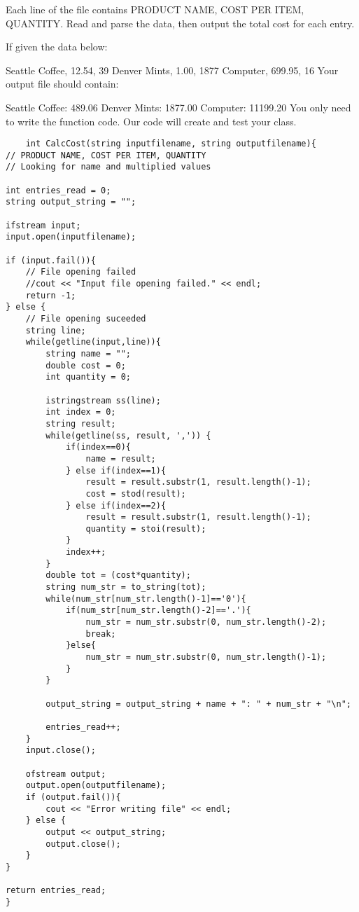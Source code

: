 \documentclass{article}
\begin{document}
\begin{enumerate}
Each line of the file contains PRODUCT NAME, COST PER ITEM, QUANTITY.  Read and parse the data, then output the total cost for each entry.

If given the data below:

Seattle Coffee, 12.54, 39
Denver Mints, 1.00, 1877
Computer, 699.95, 16
Your output file should contain:

Seattle Coffee: 489.06
Denver Mints: 1877.00
Computer: 11199.20
You only need to write the function code.  Our code will create and test your class.

\begin{lstlisting}
	int CalcCost(string inputfilename, string outputfilename){
// PRODUCT NAME, COST PER ITEM, QUANTITY
// Looking for name and multiplied values

int entries_read = 0;
string output_string = "";

ifstream input;
input.open(inputfilename);

if (input.fail()){
    // File opening failed
    //cout << "Input file opening failed." << endl;
    return -1;
} else {
    // File opening suceeded
    string line;
    while(getline(input,line)){
        string name = "";
        double cost = 0;
        int quantity = 0;
        
        istringstream ss(line);
        int index = 0;
        string result;
		while(getline(ss, result, ',')) {
		    if(index==0){
                name = result;
		    } else if(index==1){
		        result = result.substr(1, result.length()-1);
                cost = stod(result);
		    } else if(index==2){
		        result = result.substr(1, result.length()-1);
		        quantity = stoi(result);
		    }
		    index++;
		}
		double tot = (cost*quantity);
		string num_str = to_string(tot);
		while(num_str[num_str.length()-1]=='0'){
		    if(num_str[num_str.length()-2]=='.'){
		        num_str = num_str.substr(0, num_str.length()-2);
		        break;
		    }else{
		        num_str = num_str.substr(0, num_str.length()-1);
		    }
		}
		
		output_string = output_string + name + ": " + num_str + "\n";
		
		entries_read++;
    }
    input.close();
    
    ofstream output;
    output.open(outputfilename);
    if (output.fail()){
        cout << "Error writing file" << endl;
    } else {
        output << output_string;
        output.close();
    }
}

return entries_read;
}
\end{lstlisting}
\end{enumerate}
\end{document}
